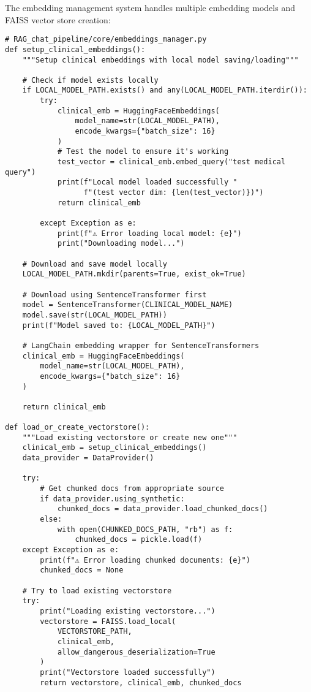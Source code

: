 The embedding management system handles multiple embedding models and FAISS vector store creation:

\begin{verbatim}
# RAG_chat_pipeline/core/embeddings_manager.py
def setup_clinical_embeddings():
    """Setup clinical embeddings with local model saving/loading"""
    
    # Check if model exists locally
    if LOCAL_MODEL_PATH.exists() and any(LOCAL_MODEL_PATH.iterdir()):
        try:
            clinical_emb = HuggingFaceEmbeddings(
                model_name=str(LOCAL_MODEL_PATH),
                encode_kwargs={"batch_size": 16}
            )
            # Test the model to ensure it's working
            test_vector = clinical_emb.embed_query("test medical query")
            print(f"Local model loaded successfully "
                  f"(test vector dim: {len(test_vector)})")
            return clinical_emb
        
        except Exception as e:
            print(f"⚠️ Error loading local model: {e}")
            print("Downloading model...")
    
    # Download and save model locally
    LOCAL_MODEL_PATH.mkdir(parents=True, exist_ok=True)
    
    # Download using SentenceTransformer first
    model = SentenceTransformer(CLINICAL_MODEL_NAME)
    model.save(str(LOCAL_MODEL_PATH))
    print(f"Model saved to: {LOCAL_MODEL_PATH}")
    
    # LangChain embedding wrapper for SentenceTransformers
    clinical_emb = HuggingFaceEmbeddings(
        model_name=str(LOCAL_MODEL_PATH),
        encode_kwargs={"batch_size": 16}
    )
    
    return clinical_emb

def load_or_create_vectorstore():
    """Load existing vectorstore or create new one"""
    clinical_emb = setup_clinical_embeddings()
    data_provider = DataProvider()
    
    try:
        # Get chunked docs from appropriate source
        if data_provider.using_synthetic:
            chunked_docs = data_provider.load_chunked_docs()
        else:
            with open(CHUNKED_DOCS_PATH, "rb") as f:
                chunked_docs = pickle.load(f)
    except Exception as e:
        print(f"⚠️ Error loading chunked documents: {e}")
        chunked_docs = None
    
    # Try to load existing vectorstore
    try:
        print("Loading existing vectorstore...")
        vectorstore = FAISS.load_local(
            VECTORSTORE_PATH,
            clinical_emb,
            allow_dangerous_deserialization=True
        )
        print("Vectorstore loaded successfully")
        return vectorstore, clinical_emb, chunked_docs
    

\end{verbatim}
